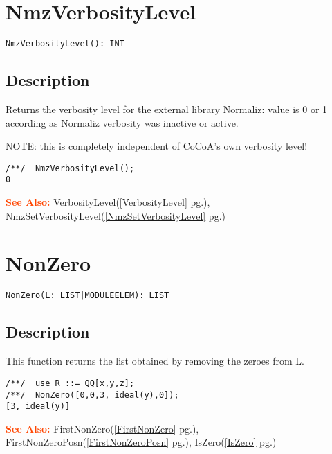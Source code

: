\documentclass[a4paper]{mybook}
\newenvironment{command}{}{} %
\newcommand\SeeAlso{\par\textcolor{OrangeRed}{\textbf{\large See Also: }}}
\begin{document}
\section{NmzVerbosityLevel}
\label{NmzVerbosityLevel}
\begin{command} %


\begin{Verbatim}[label=syntax, rulecolor=\color{MidnightBlue},
frame=single]
NmzVerbosityLevel(): INT
\end{Verbatim}


\subsection*{Description}

Returns the verbosity level for the external library Normaliz:
value is 0 or 1 according as Normaliz verbosity was inactive or active.
\par 
NOTE: this is completely independent of CoCoA's own verbosity level!
\begin{Verbatim}[label=example, rulecolor=\color{PineGreen}, frame=single]
/**/  NmzVerbosityLevel();
0
\end{Verbatim}


\SeeAlso %
  VerbosityLevel(\ref{VerbosityLevel} pg.\pageref{VerbosityLevel}), 
    NmzSetVerbosityLevel(\ref{NmzSetVerbosityLevel} pg.\pageref{NmzSetVerbosityLevel})
\end{command} %

\section{NonZero}
\label{NonZero}
\begin{command} %


\begin{Verbatim}[label=syntax, rulecolor=\color{MidnightBlue},
frame=single]
NonZero(L: LIST|MODULEELEM): LIST
\end{Verbatim}


\subsection*{Description}

This function returns the list obtained by removing the zeroes from L.
\begin{Verbatim}[label=example, rulecolor=\color{PineGreen}, frame=single]
/**/  use R ::= QQ[x,y,z];
/**/  NonZero([0,0,3, ideal(y),0]);
[3, ideal(y)]
\end{Verbatim}


\SeeAlso %
  FirstNonZero(\ref{FirstNonZero} pg.\pageref{FirstNonZero}), 
    FirstNonZeroPosn(\ref{FirstNonZeroPosn} pg.\pageref{FirstNonZeroPosn}), 
    IsZero(\ref{IsZero} pg.\pageref{IsZero})
\end{command} %
\end{document}
